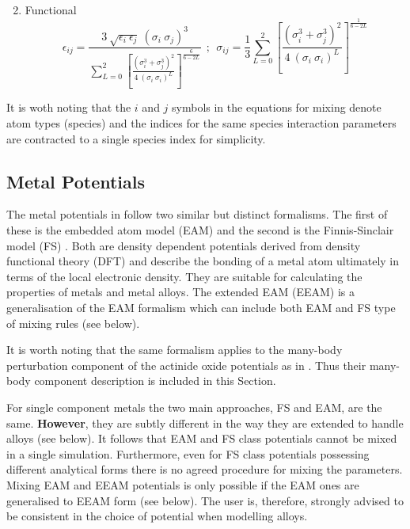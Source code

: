 \begin{enumerate}
\begin{equation}
\end{equation}
\item Functional
\begin{equation}
\epsilon_{ij} = \frac{3~\sqrt{\epsilon_{i}~\epsilon_{j}}~(\sigma_{i}~\sigma_{j})^{3}}
{\sum\limits_{L=0}^{2}{\left[\frac{\left(\sigma_{i}^{3}+\sigma_{j}^{3}\right)^{2}}{4~(\sigma_{i}~\sigma_{i})^{L}}\right]^{\frac{6}{6-2L}}}}~~;~~\sigma_{ij}=\frac{1}{3}\sum\limits_{L=0}^{2}{\left[\frac{\left(\sigma_{i}^{3}+\sigma_{j}^{3}\right)^{2}}{4~(\sigma_{i}~\sigma_{i})^{L}}\right]^{\frac{1}{6-2L}}}
\end{equation}
\end{enumerate}
It is woth noting that the $i$ and $j$ symbols in the equations
for mixing denote atom types (species) and the indices for the
same species interaction parameters are contracted to a single
species index for simplicity.

\subsection{Metal Potentials}
\label{metal}

The metal potentials in \D follow two similar but distinct formalisms.
The first of these is the embedded atom model (EAM)
\cite{baskes-84a,baskes-86a} and the second is the Finnis-Sinclair
model (FS) \cite{finnis-84a}.  Both are density dependent potentials
derived from density functional theory (DFT) and describe the bonding
of a metal atom ultimately in terms of the local electronic density.
They are suitable for calculating the properties of metals
 and metal alloys.  The extended EAM (EEAM)
\cite{hepburn-08a,lau-07a} is a generalisation of the EAM formalism
which can include both EAM and FS type of mixing rules (see below).

It is worth noting that the same formalism applies to the many-body
perturbation component of the actinide oxide potentials as in
\cite{cooper-14a}.  Thus their many-body component description is
included in this Section.

For single component metals the two main approaches, FS and EAM, are the same.
{\bf However}, they are subtly different in the way they are extended to
handle alloys (see below).  It follows that EAM and FS class potentials
cannot be mixed in a single simulation.  Furthermore, even for FS
class potentials possessing different analytical forms there is no
agreed procedure for mixing the parameters.  Mixing EAM and EEAM
potentials is only possible if the EAM ones are generalised to EEAM
form (see below).  The user is, therefore, strongly advised to be
consistent in the choice of potential when modelling alloys.

